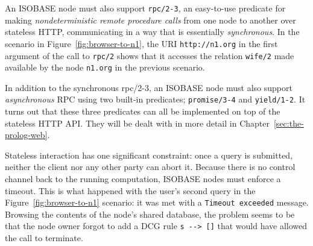 An ISOBASE node must also support \texttt{rpc/2-3}, an easy-to-use predicate for making \textit{nondeterministic remote procedure calls} from one node to another over stateless HTTP, communicating in a way that is essentially \textit{synchronous}. In the scenario in Figure~\ref{fig:browser-to-n1}, the URI \texttt{http://n1.org} in the first argument of the call to \texttt{rpc/2} shows that it accesses the relation \texttt{wife/2} made available by the node \texttt{n1.org} in the previous scenario. 

In addition to the synchronous rpc/2-3, an ISOBASE node must also support \textit{asynchronous} RPC using two built-in predicates; \texttt{promise/3-4} and \texttt{yield/1-2}. It turns out that these three predicates can all be implemented on top of the stateless HTTP API. They will be dealt with in more detail in Chapter~\ref{sec:the-prolog-web}.






Stateless interaction has one significant constraint: once a query is submitted, neither the client nor any other party can abort it. Because there is no control channel back to the running computation, ISOBASE nodes must enforce a timeout.
This is what happened with the user's second query in the Figure~\ref{fig:browser-to-n1} scenario: it was met with a \texttt{Timeout\,exceeded} message. Browsing the contents of the node's shared database, the problem seems to be that the node owner forgot to add a DCG rule \texttt{s\,{-}->\,[]} that would have allowed the call to terminate.

